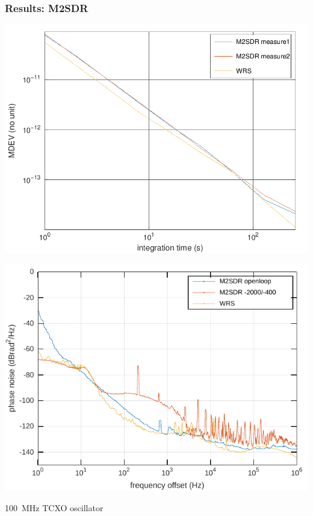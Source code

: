 \documentclass[compress,10pt,aspectratio=169]{beamer}
\begin{document}
\begin{frame}[fragile]\frametitle{Results: M2SDR}

\begin{minipage}[t]{1.07\linewidth}
\begin{minipage}{.49\linewidth}
\includegraphics[width=\linewidth]{M2SDR_vs_WRS_allan}
\end{minipage}
\begin{minipage}{.49\linewidth}
\includegraphics[width=\linewidth]{m2sdr.pdf}
\end{minipage}
\end{minipage}

100~MHz TCXO oscillator
\end{frame}
\end{document}
